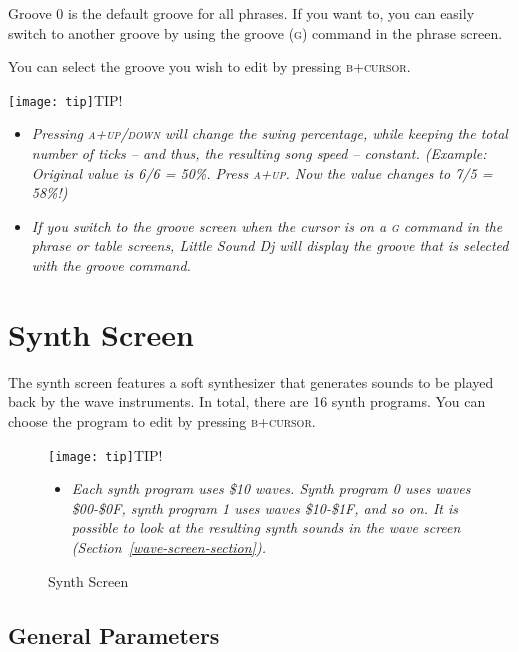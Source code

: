Groove 0 is the default groove for all phrases. If you want to, you can easily switch to another groove by using the groove (\textsc{g}) command in the phrase screen.

You can select the groove you wish to edit by pressing \textsc{b+cursor}.

\texttt{[image: tip]}TIP!
\begin{itemize}
	\item \textit{ Pressing \textsc{a+up/down} will change the swing percentage, while keeping the total number of ticks -- and thus, the resulting song speed -- constant. (Example: Original value is 6/6 = 50\%. Press \textsc{a+up}. Now the value changes to 7/5 = 58\%!) }
	\item \textit{ If you switch to the groove screen when the cursor is on a \textsc{g} command in the phrase or table screens, Little Sound Dj will display the groove that is selected with the groove command.}
\end{itemize}

\section{Synth Screen}

The synth screen features a soft synthesizer that generates sounds to be played back by the wave instruments. In total, there are 16 synth programs. You can choose the program to edit by pressing \textsc{b+cursor}.

\begin{figure}[h]
\texttt{[image: tip]}TIP!
\begin{itemize}
	\item \textit{Each synth program uses \$10 waves. Synth program 0 uses waves \$00-\$0F, synth program 1 uses waves \$10-\$1F, and so on. It is possible to look at the resulting synth sounds in the wave screen (Section~\ref{wave-screen-section}).}
\end{itemize}
\end{figure}

\begin{figure}[htbp]
	\begin{center}
	\end{center}
	\caption{Synth Screen}
	\label{fig:synth}
\end{figure}

\subsection{General Parameters}

